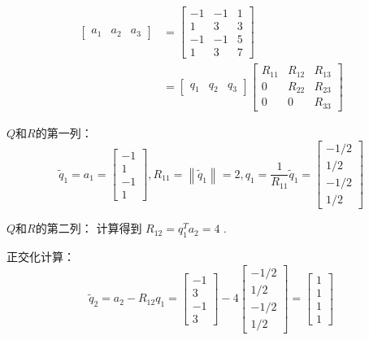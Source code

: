\begin{example}
    \begin{equation}
\begin{aligned}
\left[\begin{array}{lll}
a_{1} & a_{2} & a_{3}
\end{array}\right] &=\left[\begin{array}{rrr}
-1 & -1 & 1 \\
1 & 3 & 3 \\
-1 & -1 & 5 \\
1 & 3 & 7
\end{array}\right] \\
&=\left[\begin{array}{lll}
q_{1} & q_{2} & q_{3}
\end{array}\right]\left[\begin{array}{ccc}
R_{11} & R_{12} & R_{13} \\
0 & R_{22} & R_{23} \\
0 & 0 & R_{33}
\end{array}\right]
\end{aligned}
\end{equation}

$Q$和$R$的第一列：
\begin{equation}
\tilde{q}_{1}=a_{1}=\left[\begin{array}{r}
-1 \\
1 \\
-1 \\
1
\end{array}\right],  R_{11}=\left\|\tilde{q}_{1}\right\|=2,  q_{1}=\frac{1}{R_{11}} \tilde{q}_{1}=\left[\begin{array}{r}
-1 / 2 \\
1 / 2 \\
-1 / 2 \\
1 / 2
\end{array}\right]
\end{equation}

$Q$和$R$的第二列：
计算得到 $R_{12}=q_{1}^{T} a_{2}=4$ .

正交化计算：
\begin{equation}
\tilde{q}_{2}=a_{2}-R_{12} q_{1}=\left[\begin{array}{r}
-1 \\
3 \\
-1 \\
3
\end{array}\right]-4\left[\begin{array}{c}
-1 / 2 \\
1 / 2 \\
-1 / 2 \\
1 / 2
\end{array}\right]=\left[\begin{array}{l}
1 \\
1 \\
1 \\
1
\end{array}\right]
\end{equation}


\end{example}
